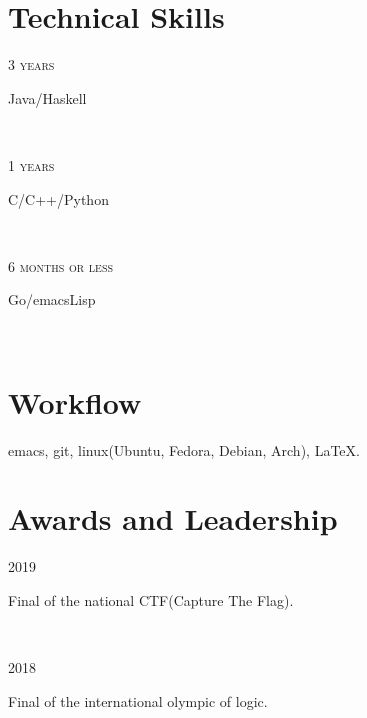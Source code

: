 \documentclass{article}
\newcommand{\entry}[4]{
  
  \begin{minipage}[t]{.15\textwidth}
    \hfill \textsc{#1}
  \end{minipage}
  \hfill\vline\hfill
  \begin{minipage}[t]{.80\textwidth}
    #2
    \textit{#3}
    \footnotesize{#4}
  \end{minipage}\\
}
\begin{document}
\section{Technical Skills}
\entry{3 years}{Java/Haskell}{}{}
\entry{1 years}{C/C++/Python}{}{}
\entry{6 months or less}{Go/emacsLisp}{}{}

\section{Workflow}
emacs, git, linux(Ubuntu, Fedora, Debian, Arch), \LaTeX.

\section{Awards and Leadership}
\entry{2019}{Final of the national CTF(Capture The Flag).}{}{}
\entry{2018}{Final of the international olympic of logic.}{}{}
\end{document}
